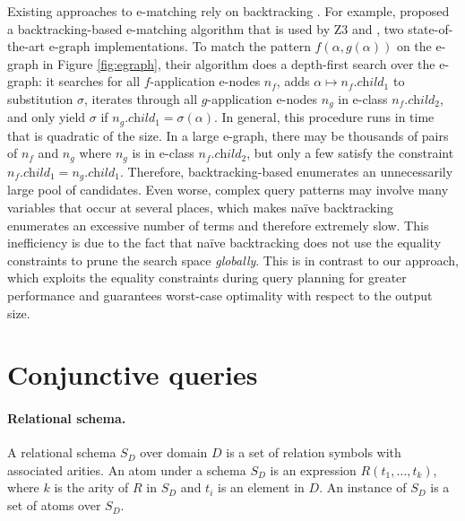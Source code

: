 Existing approaches to e-matching rely on backtracking \citep{efficient-ematching,simplify,egg}. 
For example, \citet{efficient-ematching} proposed a backtracking-based e-matching algorithm that is used by \textsc{Z3} \citep{Z3} and \egg \citep{egg}, two state-of-the-art e-graph implementations. 
To match the pattern $f(\alpha, g(\alpha))$ on the e-graph in Figure \ref{fig:egraph}, their algorithm does a depth-first search over the e-graph:
it searches for all $f$-application e-nodes $n_f$, adds $\alpha\mapsto n_f.\textit{child}_1$ to substitution $\sigma$, iterates through all $g$-application e-nodes $n_g$ in e-class $n_f.\textit{child}_2$, and only yield $\sigma$ if $n_g.\textit{child}_1=\sigma(\alpha)$.
In general, this procedure runs in time that is quadratic of the \egraph size.
In a large e-graph, there may be thousands of pairs of $n_f$ and $n_g$ where $n_g$ is in e-class $n_f.\textit{child}_2$, but only a few satisfy the constraint $n_f.\textit{child}_1=n_g.\textit{child}_1$. Therefore, backtracking-based \ematching enumerates an unnecessarily large pool of candidates.
Even worse, complex query patterns may involve many variables that occur at several places, which makes na\"ive backtracking enumerates an excessive number of terms and therefore extremely slow. 
This inefficiency is due to the fact that na\"ive backtracking does not use the equality constraints to prune the search space \textit{globally}. 
This is in contrast to our approach, which exploits the equality constraints during query planning for greater performance and guarantees worst-case optimality with respect to the output size.
  

\section{Conjunctive queries}

\paragraph{Relational schema.}
A relational schema $S_D$ over domain $D$ is a set of relation symbols with associated arities. An atom under a schema $S_D$ is an expression $R(t_1,\ldots,t_k)$, where $k$ is the arity of $R$ in $S_D$ and $t_i$ is an element in $D$. An instance of $S_D$ is a set of atoms over $S_D$. 

